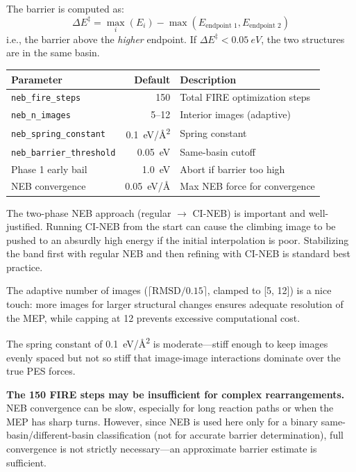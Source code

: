 \documentclass[11pt,a4paper]{article}
\begin{document}
The barrier is computed as:
\begin{equation}
    \Delta E^\ddagger = \max_i(E_i) - \max(E_\text{endpoint 1}, E_\text{endpoint 2})
\end{equation}
i.e., the barrier above the \emph{higher} endpoint. If $\Delta E^\ddagger < \SI{0.05}{eV}$, the two structures are in the same basin.

\begin{threshbox}
\begin{tabular}{lrl}
\toprule
Parameter & Default & Description \\
\midrule
\texttt{neb\_fire\_steps} & 150 & Total FIRE optimization steps \\
\texttt{neb\_n\_images} & 5--12 & Interior images (adaptive) \\
\texttt{neb\_spring\_constant} & \SI{0.1}{eV/\angstrom^2} & Spring constant \\
\texttt{neb\_barrier\_threshold} & \SI{0.05}{eV} & Same-basin cutoff \\
Phase 1 early bail & \SI{1.0}{eV} & Abort if barrier too high \\
NEB convergence & \SI{0.05}{eV/\angstrom} & Max NEB force for convergence \\
\bottomrule
\end{tabular}
\end{threshbox}

\begin{evaluation}
The two-phase NEB approach (regular $\to$ CI-NEB) is important and well-justified. Running CI-NEB from the start can cause the climbing image to be pushed to an absurdly high energy if the initial interpolation is poor. Stabilizing the band first with regular NEB and then refining with CI-NEB is standard best practice.

The adaptive number of images ($\lceil\text{RMSD}/0.15\rceil$, clamped to [5, 12]) is a nice touch: more images for larger structural changes ensures adequate resolution of the MEP, while capping at 12 prevents excessive computational cost.

The spring constant of \SI{0.1}{eV/\angstrom^2} is moderate---stiff enough to keep images evenly spaced but not so stiff that image-image interactions dominate over the true PES forces.

\textbf{The 150 FIRE steps may be insufficient for complex rearrangements.} NEB convergence can be slow, especially for long reaction paths or when the MEP has sharp turns. However, since NEB is used here only for a binary same-basin/different-basin classification (not for accurate barrier determination), full convergence is not strictly necessary---an approximate barrier estimate is sufficient.
\end{evaluation}
\end{document}
